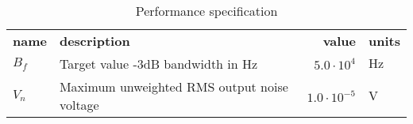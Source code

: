 \begin{table}[H]
\centering
\begin{tabular}[c]{llrl}
\textbf{name} & \textbf{description} & \textbf{value} & \textbf{units} \\ 
\rowcolor{myyellow}
$B_{f}$ &\small{Target value -3dB bandwidth in Hz} &$5.0 \cdot 10^{4}$ &$\mathrm{Hz}$ \\ 
$V_{n}$ &\small{Maximum unweighted RMS output noise voltage} &$1.0 \cdot 10^{-5}$ &$\mathrm{V}$ \\ 
\end{tabular}
\caption{Performance specification}
\end{table}


